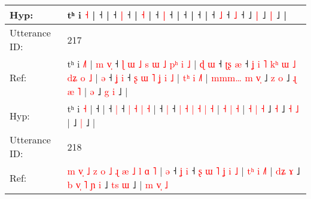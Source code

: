 \documentclass[10pt]{article}
\DeclareRobustCommand{\hl}[1]{{\textcolor{red}{#1}}}
\begin{document}
\begin{longtable}{ll}
 \\
Hyp: & tʰ i \hl{}\hl{˧} |\hl{}\hl{}\hl{}\hl{}\hl{} ˧ |\hl{}\hl{} ˧ \hl{}\hl{|} ˧\hl{} |\hl{}\hl{}\hl{}\hl{}\hl{} \hl{˧} |\hl{}\hl{} ˧\hl{}\hl{} \hl{|} ˧\hl{}\hl{}\hl{}\hl{}\hl{}\hl{}\hl{}\hl{}\hl{}\hl{}\hl{}\hl{} |\hl{}\hl{}\hl{}\hl{}\hl{}\hl{}\hl{}\hl{}\hl{}\hl{} ˧\hl{}\hl{}\hl{}\hl{}\hl{}\hl{}\hl{}\hl{}\hl{}\hl{}\hl{}\hl{}\hl{}\hl{}\hl{}\hl{}\hl{}\hl{}\hl{}\hl{}\hl{}\hl{}\hl{}\hl{}\hl{}\hl{}\hl{}\hl{}\hl{}\hl{}\hl{} |\hl{}\hl{}\hl{}\hl{}\hl{} ˧\hl{}\hl{}\hl{}\hl{}\hl{}\hl{}\hl{}\hl{}\hl{}\hl{}\hl{}\hl{}\hl{}\hl{}\hl{}\hl{}\hl{}\hl{}\hl{} |\hl{}\hl{}\hl{}\hl{} ˧\hl{}\hl{}\hl{} \hl{˩} ˧\hl{}\hl{} \hl{˩} ˧\hl{}\hl{}\hl{}\hl{}\hl{}\hl{}\hl{}\hl{}\hl{}\hl{}\hl{}\hl{} ˩\hl{}\hl{} \hl{|} ˩\hl{}\hl{} \hl{|} ˩ |
 \\
\midrule
Utterance ID: & 217 \\
Ref: & tʰ i \hl{˩}\hl{˥} |\hl{ }\hl{m}\hl{ }\hl{v}\hl{̩} ˧\hl{ }\hl{ɭ}\hl{ }\hl{ɯ}\hl{ }\hl{˩}\hl{ }\hl{s}\hl{ }\hl{ɯ}\hl{ }\hl{˩}\hl{ }\hl{p}\hl{ʰ}\hl{ }\hl{i}\hl{ }\hl{˩} |\hl{ }\hl{ɖ}\hl{ }\hl{ɯ} ˧\hl{ }\hl{ʈ}\hl{ʂ} \hl{æ} ˧\hl{ }\hl{ʝ}\hl{ }\hl{i}\hl{ }\hl{˥}\hl{ }\hl{k}\hl{ʰ}\hl{ }\hl{ɯ} \hl{˩} \hl{d}\hl{ʑ} \hl{o} \hl{˩} |\hl{ }\hl{ə} ˧\hl{ }\hl{ʝ} \hl{i} ˧ \hl{ʂ} \hl{ɯ} \hl{˥} \hl{ʝ} \hl{i} \hl{˩} | \hl{t}\hl{ʰ} \hl{i} \hl{˩}\hl{˥} | \hl{m}\hl{m}\hl{m}\hl{…} \hl{m} \hl{v}\hl{̩} ˩\hl{ }\hl{z} \hl{o} ˩\hl{ }\hl{ɻ} \hl{æ} \hl{˥} |\hl{ }\hl{ə} ˩\hl{ }\hl{g} \hl{i} ˩ |
 \\
Hyp: & tʰ i \hl{}\hl{˧} |\hl{}\hl{}\hl{}\hl{}\hl{} ˧\hl{}\hl{}\hl{}\hl{}\hl{}\hl{}\hl{}\hl{}\hl{}\hl{}\hl{}\hl{}\hl{}\hl{}\hl{}\hl{}\hl{}\hl{}\hl{} |\hl{}\hl{}\hl{}\hl{} ˧\hl{}\hl{}\hl{} \hl{|} ˧\hl{}\hl{}\hl{}\hl{}\hl{}\hl{}\hl{}\hl{}\hl{}\hl{}\hl{} \hl{|} \hl{}\hl{˧} \hl{|} \hl{˧} |\hl{}\hl{} ˧\hl{}\hl{} \hl{|} ˧ \hl{|} \hl{˧} \hl{|} \hl{˧} \hl{|} \hl{˧} | \hl{}\hl{˧} \hl{|} \hl{}\hl{˧} | \hl{}\hl{}\hl{}\hl{˧} \hl{|} \hl{}\hl{˧} ˩\hl{}\hl{} \hl{˧} ˩\hl{}\hl{} \hl{˧} \hl{˩} |\hl{}\hl{} ˩\hl{}\hl{} \hl{|} ˩ |
 \\
\midrule
Utterance ID: & 218 \\
Ref: & \hl{m}\hl{ }\hl{v}\hl{̩}\hl{ }\hl{˩}\hl{ }\hl{z}\hl{ }\hl{o}\hl{ }\hl{˩}\hl{ }\hl{ɻ}\hl{ }\hl{æ}\hl{ }\hl{˩}\hl{ }\hl{l} \hl{ɑ} \hl{˥} |\hl{ }\hl{ə} ˧\hl{ }\hl{ʝ} \hl{i} ˧\hl{ }\hl{ʂ}\hl{ }\hl{ɯ}\hl{ }\hl{˥}\hl{ }\hl{ʝ}\hl{ }\hl{i}\hl{ }\hl{˩} |\hl{ }\hl{t}\hl{ʰ}\hl{ }\hl{i} \hl{˩}\hl{˥} |\hl{ }\hl{d}\hl{ʑ} \hl{ɤ} ˩\hl{ }\hl{b}\hl{ }\hl{v}\hl{̩}\hl{ }\hl{˥} \hl{ɲ} \hl{i} ˩\hl{ }\hl{t}\hl{s} \hl{ɯ} ˩ |\hl{ }\hl{m}\hl{ }\hl{v}\hl{̩}\hl{ }\hl{˩}
 \\

\end{longtable}
\end{document}
